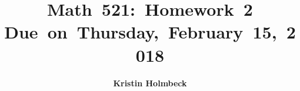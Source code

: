 


\newcommand{\hmwkTitle}{Homework\ 2} %
\newcommand{\hmwkDueDate}{Thursday,\ February\ 15,\ 2018} %
\newcommand{\hmwkClass}{Math\ 521} %
\newcommand{\hmwkAuthorName}{Kristin Holmbeck} %


\title{
\vspace{2in}
\textmd{\textbf{\hmwkClass:\ \hmwkTitle}}\\
\normalsize\vspace{0.1in}\small{Due\ on\ \hmwkDueDate}\\
\vspace{0.1in}
\vspace{3in}
}

\author{\textbf{\hmwkAuthorName}}
\date{} %




\maketitle



\newpage
\tableofcontents
\listoffigures
\newpage



